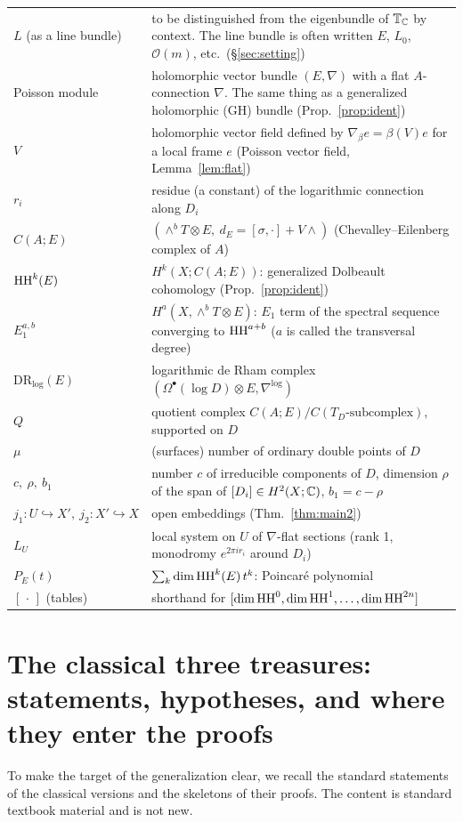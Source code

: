 \begin{longtable}{>{\raggedright\arraybackslash}p{3.4cm}>{\raggedright\arraybackslash}p{11.6cm}}
$L$ (as a line bundle) & to be distinguished from the eigenbundle of $\mathbb T_\mathbb C$ by context. The line bundle is often written $E$, $L_0$, $\mathcal O(m)$, etc.\ (\S\ref{sec:setting})\\
Poisson module & holomorphic vector bundle $(E,\nabla)$ with a flat $A$-connection $\nabla$. The same thing as a generalized holomorphic (GH) bundle (Prop.~\ref{prop:ident})\\
$V$ & holomorphic vector field defined by $\nabla_\beta e=\beta(V)e$ for a local frame $e$ (Poisson vector field, Lemma~\ref{lem:flat})\\
$r_i$ & residue (a constant) of the logarithmic connection along $D_i$\\
$C(A;E)$ & $(\wedge^bT\otimes E,\ d_E=[\sigma,\cdot]+V\wedge)$ (Chevalley--Eilenberg complex of $A$)\\
$\mathrm{HH}^k(E)$ & $H^k(X;C(A;E))$: generalized Dolbeault cohomology (Prop.~\ref{prop:ident})\\
$E_1^{a,b}$ & $H^a(X,\wedge^bT\otimes E)$: $E_1$ term of the spectral sequence converging to $\mathrm{HH}^{a+b}$ ($a$ is called the transversal degree)\\
$\mathrm{DR}_{\log}(E)$ & logarithmic de Rham complex $(\Omega^\bullet(\log D)\otimes E,\nabla^{\log})$\\
$Q$ & quotient complex $C(A;E)/C(T_D\text{-subcomplex})$, supported on $D$\\
$\mu$ & (surfaces) number of ordinary double points of $D$\\
$c,\ \rho,\ b_1$ & number $c$ of irreducible components of $D$, dimension $\rho$ of the span of $[D_i]\in H^2(X;\mathbb C)$, $b_1=c-\rho$\\
$j_1:U\hookrightarrow X',\ j_2:X'\hookrightarrow X$ & open embeddings (Thm.~\ref{thm:main2})\\
$L_U$ & local system on $U$ of $\nabla$-flat sections (rank 1, monodromy $e^{2\pi ir_i}$ around $D_i$)\\
$P_E(t)$ & $\sum_k\dim\mathrm{HH}^k(E)\,t^k$: Poincar\'e polynomial\\
$[\,\cdot\,]$ (tables) & shorthand for $[\dim\mathrm{HH}^0,\dim\mathrm{HH}^1,\dots,\dim\mathrm{HH}^{2n}]$\\
\bottomrule
\end{longtable}

\section{The classical three treasures: statements, hypotheses, and where they enter the proofs}\label{sec:classical}
To make the target of the generalization clear, we recall the standard statements of the classical versions and the skeletons of their proofs. The content is standard textbook material and is not new.

